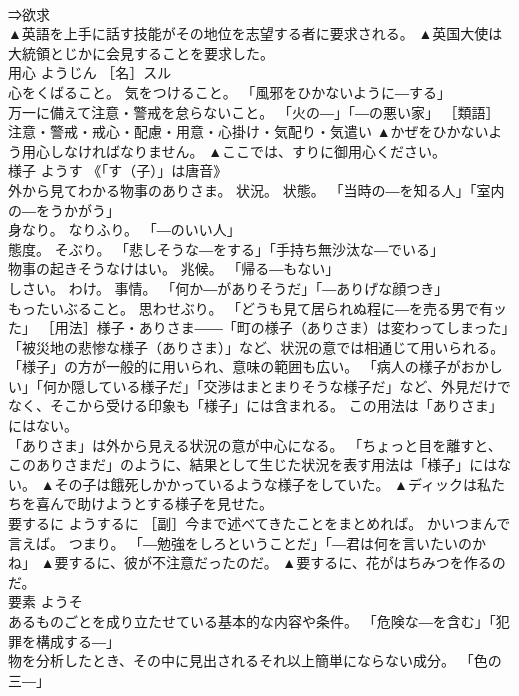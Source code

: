 \documentclass[8pt]{extreport}
\begin{document}
\begin{CJK}{UTF8}{min}
\\	⇒欲求 
\\	▲英語を上手に話す技能がその地位を志望する者に要求される。 ▲英国大使は大統領とじかに会見することを要求した。
\\	用心	ようじん	［名］スル 
\\	心をくばること。 気をつけること。 「風邪をひかないように―する」 
\\	万一に備えて注意・警戒を怠らないこと。 「火の―」「―の悪い家」 ［類語］
\\	注意・警戒・戒心・配慮・用意・心掛け・気配り・気遣い	▲かぜをひかないよう用心しなければなりません。 ▲ここでは、すりに御用心ください。
\\	様子	ようす	《「す（子）」は唐音》 
\\	外から見てわかる物事のありさま。 状況。 状態。 「当時の―を知る人」「室内の―をうかがう」 
\\	身なり。 なりふり。 「―のいい人」 
\\	態度。 そぶり。 「悲しそうな―をする」「手持ち無沙汰な―でいる」 
\\	物事の起きそうなけはい。 兆候。 「帰る―もない」 
\\	しさい。 わけ。 事情。 「何か―がありそうだ」「―ありげな顔つき」 
\\	もったいぶること。 思わせぶり。 「どうも見て居られぬ程に―を売る男で有ッた」 ［用法］様子・ありさま――「町の様子（ありさま）は変わってしまった」「被災地の悲惨な様子（ありさま）」など、状況の意では相通じて用いられる。 
\\	「様子」の方が一般的に用いられ、意味の範囲も広い。 「病人の様子がおかしい」「何か隠している様子だ」「交渉はまとまりそうな様子だ」など、外見だけでなく、そこから受ける印象も「様子」には含まれる。 この用法は「ありさま」にはない。 
\\	「ありさま」は外から見える状況の意が中心になる。 「ちょっと目を離すと、このありさまだ」のように、結果として生じた状況を表す用法は「様子」にはない。	▲その子は餓死しかかっているような様子をしていた。 ▲ディックは私たちを喜んで助けようとする様子を見せた。
\\	要するに	ようするに	［副］今まで述べてきたことをまとめれば。 かいつまんで言えば。 つまり。 「―勉強をしろということだ」「―君は何を言いたいのかね」	▲要するに、彼が不注意だったのだ。 ▲要するに、花がはちみつを作るのだ。
\\	要素	ようそ	
\\	あるものごとを成り立たせている基本的な内容や条件。 「危険な―を含む」「犯罪を構成する―」 
\\	物を分析したとき、その中に見出されるそれ以上簡単にならない成分。 「色の三―」 

\end{CJK}
\end{document}
